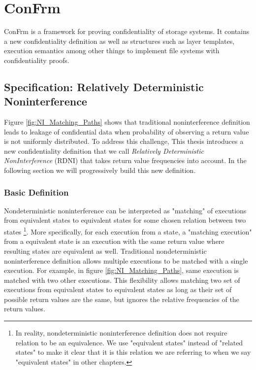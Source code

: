 \chapter{ConFrm}
\label{chapter:ConFrm}

ConFrm is a framework for proving confidentiality of storage systems. It contains a new confidentiality definition as well as structures such as layer templates, execution semantics among other things to implement file systems with confidentiality proofs. 

\section{Specification: Relatively Deterministic Noninterference}
Figure \ref{fig:NI_Matching_Paths} shows that traditional noninterference definition leads to leakage of confidential data when probability of observing a return value is not uniformly distributed. To address this challenge, This thesis introduces a new confidentiality definition that we call \emph{Relatively Deterministic NonInterference} (RDNI) that takes return value frequencies into account. In the following section we will progressively build this new definition. 

\subsection{Basic Definition}
Nondeterministic noninterference can be interpreted as "matching" of executions from equivalent states to equivalent states for some chosen relation between two states 
%
\footnote{In reality, nondeterministic noninterference definition does not require relation to be an equivalence. We use "equivalent states" instead of "related states" to make it clear that it is this relation we are referring to when we say "equivalent states" in other chapters.}. 
%
More specifically, for each execution from a state, a "matching execution" from a equivalent state is an execution with the same return value where resulting states are equivalent as well. Traditional nondeterministic noninterference definition allows multiple executions to be matched with a single execution. For example, in figure \ref{fig:NI_Matching_Paths}, same execution is matched with two other executions. This flexibility allows matching two set of executions from equivalent states to equivalent states as long as their set of possible return values are the same, but ignores the relative frequencies of the return values.

